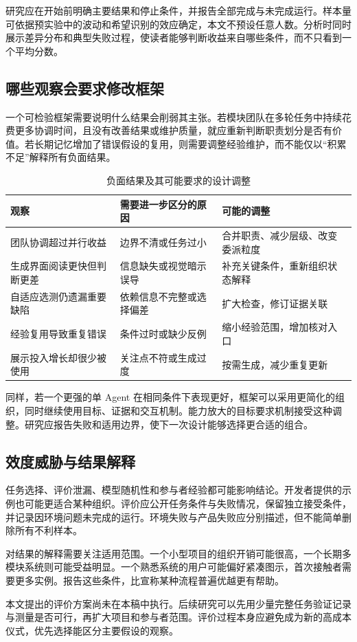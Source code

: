 研究应在开始前明确主要结果和停止条件，并报告全部完成与未完成运行。样本量可依据预实验中的波动和希望识别的效应确定，本文不预设任意人数。分析时同时展示差异分布和典型失败过程，使读者能够判断收益来自哪些条件，而不只看到一个平均分数。

\subsection{哪些观察会要求修改框架}
一个可检验框架需要说明什么结果会削弱其主张。若模块团队在多轮任务中持续花费更多协调时间，且没有改善结果或维护质量，就应重新判断职责划分是否有价值。若长期记忆增加了错误假设的复用，则需要调整经验维护，而不能仅以“积累不足”解释所有负面结果。

\begin{table}[htbp]\centering\small
\caption{负面结果及其可能要求的设计调整}\label{tab:falsifiers}
\begin{tabularx}{\linewidth}{p{3.6cm}YY}\toprule
观察 & 需要进一步区分的原因 & 可能的调整\\\midrule
团队协调超过并行收益 & 边界不清或任务过小 & 合并职责、减少层级、改变委派粒度\\
生成界面阅读更快但判断更差 & 信息缺失或视觉暗示误导 & 补充关键条件，重新组织状态解释\\
自适应选测仍遗漏重要缺陷 & 依赖信息不完整或选择偏差 & 扩大检查，修订证据关联\\
经验复用导致重复错误 & 条件过时或缺少反例 & 缩小经验范围，增加核对入口\\
展示投入增长却很少被使用 & 关注点不符或生成过度 & 按需生成，减少重复更新\\\bottomrule
\end{tabularx}\end{table}

同样，若一个更强的单 Agent 在相同条件下表现更好，框架可以采用更简化的组织，同时继续使用目标、证据和交互机制。能力放大的目标要求机制接受这种调整。研究应报告失败和适用边界，使下一次设计能够选择更合适的组合。

\subsection{效度威胁与结果解释}
任务选择、评价泄漏、模型随机性和参与者经验都可能影响结论。开发者提供的示例也可能更适合某种组织。评价应公开任务条件与失败情况，保留独立接受条件，并记录因环境问题未完成的运行。环境失败与产品失败应分别描述，但不能简单删除所有不利样本。

对结果的解释需要关注适用范围。一个小型项目的组织开销可能很高，一个长期多模块系统则可能受益明显。一个熟悉系统的用户可能偏好紧凑图示，首次接触者需要更多实例。报告这些条件，比宣称某种流程普遍优越更有帮助。

本文提出的评价方案尚未在本稿中执行。后续研究可以先用少量完整任务验证记录与测量是否可行，再扩大项目和参与者范围。评价过程本身应避免成为新的高成本仪式，优先选择能区分主要假设的观察。
